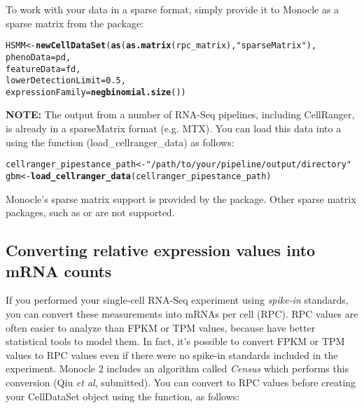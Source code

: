 \documentclass[10pt,oneside]{article}\usepackage[]{graphicx}\usepackage[]{color}
\makeatletter
\newcommand{\hlnum}[1]{\textcolor[rgb]{0.686,0.059,0.569}{#1}}%
\newcommand{\hlstr}[1]{\textcolor[rgb]{0.192,0.494,0.8}{#1}}%
\newcommand{\hlstd}[1]{\textcolor[rgb]{0.345,0.345,0.345}{#1}}%
\newcommand{\hlkwb}[1]{\textcolor[rgb]{0.69,0.353,0.396}{#1}}%
\newcommand{\hlkwc}[1]{\textcolor[rgb]{0.333,0.667,0.333}{#1}}%
\newcommand{\hlkwd}[1]{\textcolor[rgb]{0.737,0.353,0.396}{\textbf{#1}}}%
\newenvironment{kframe}{%
 \def\at@end@of@kframe{}%
 \ifinner\ifhmode%
  \def\at@end@of@kframe{\end{minipage}}%
  \begin{minipage}{\columnwidth}%
 \fi\fi%
 \def\FrameCommand##1{\hskip\@totalleftmargin \hskip-\fboxsep
 \colorbox{shadecolor}{##1}\hskip-\fboxsep
     \hskip-\linewidth \hskip-\@totalleftmargin \hskip\columnwidth}%
 \MakeFramed {\advance\hsize-\width
   \@totalleftmargin\z@ \linewidth\hsize
   \@setminipage}}%
 {\par\unskip\endMakeFramed%
 \at@end@of@kframe}
\newenvironment{knitrout}{}{} %
\makeatother
\begin{document}
To work with your data in a sparse format, simply provide it to Monocle as a sparse matrix from the  package:
 
\begin{knitrout}
\color{fgcolor}\begin{kframe}
\begin{alltt}
\hlstd{HSMM} \hlkwb{<-} \hlkwd{newCellDataSet}\hlstd{(}\hlkwd{as}\hlstd{(}\hlkwd{as.matrix}\hlstd{(rpc_matrix),} \hlstr{"sparseMatrix"}\hlstd{),}
                       \hlkwc{phenoData} \hlstd{= pd,}
                       \hlkwc{featureData} \hlstd{= fd,}
                       \hlkwc{lowerDetectionLimit}\hlstd{=}\hlnum{0.5}\hlstd{,}
                       \hlkwc{expressionFamily}\hlstd{=}\hlkwd{negbinomial.size}\hlstd{())}
\end{alltt}
\end{kframe}
\end{knitrout}
 
\textbf{NOTE:} The output from a number of RNA-Seq pipelines, including CellRanger, is already in a sparseMatrix format (e.g. MTX).  You can load this data into a  using the function \Rfunction(load_cellranger_data) as follows:

\begin{knitrout}
\color{fgcolor}\begin{kframe}
\begin{alltt}
\hlstd{cellranger_pipestance_path} \hlkwb{<-} \hlstr{"/path/to/your/pipeline/output/directory"}
\hlstd{gbm} \hlkwb{<-} \hlkwd{load_cellranger_data}\hlstd{(cellranger_pipestance_path)}
\end{alltt}
\end{kframe}
\end{knitrout}
 
Monocle's sparse matrix support is provided by the  package. Other sparse matrix packages, such as  or  are not supported.
 
\subsection{Converting relative expression values into mRNA counts} \label{conv_rel2abs}
 
If you performed your single-cell RNA-Seq experiment using \emph{spike-in} standards, you can convert these measurements into mRNAs per cell (RPC). RPC values are often easier to analyze than FPKM or TPM values, because have better statistical tools to model them. In fact, it's possible to convert FPKM or TPM values to RPC values even if there were no spike-in standards included in the experiment. Monocle 2 includes an algorithm called \emph{Census} which performs this conversion (Qiu \emph{et al}, submitted). You can convert to RPC values before creating your CellDataSet object using the  function, as follows:
 
\end{document}
